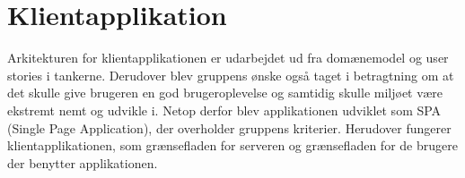 \section{Klientapplikation}

Arkitekturen for klientapplikationen er udarbejdet ud fra domænemodel og user stories i tankerne. Derudover blev gruppens ønske også taget i betragtning om at det skulle give brugeren en god brugeroplevelse og samtidig skulle miljøet være ekstremt nemt og udvikle i. Netop derfor blev applikationen udviklet som SPA (Single Page Application), der overholder gruppens kriterier. Herudover fungerer klientapplikationen, som grænsefladen for serveren og grænsefladen for de brugere der benytter applikationen.

